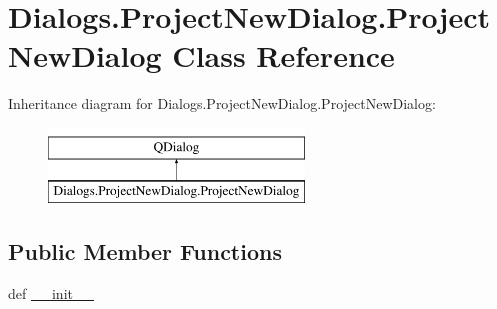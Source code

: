\hypertarget{classDialogs_1_1ProjectNewDialog_1_1ProjectNewDialog}{\section{Dialogs.\-Project\-New\-Dialog.\-Project\-New\-Dialog Class Reference}
\label{classDialogs_1_1ProjectNewDialog_1_1ProjectNewDialog}
}
Inheritance diagram for Dialogs.\-Project\-New\-Dialog.\-Project\-New\-Dialog\-:\begin{figure}[H]
\begin{center}
\leavevmode
\includegraphics[height=2.000000cm]{classDialogs_1_1ProjectNewDialog_1_1ProjectNewDialog}
\end{center}
\end{figure}
\subsection*{Public Member Functions}
\begin{DoxyCompactItemize}
\item 
def \hyperlink{classDialogs_1_1ProjectNewDialog_1_1ProjectNewDialog_ae02082b6c5cf4bf0a80a138360467787}{\-\_\-\-\_\-init\-\_\-\-\_\-}
\end{DoxyCompactItemize}
